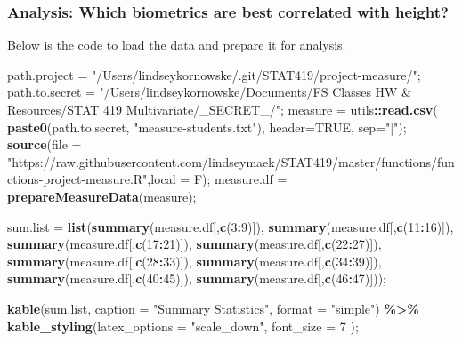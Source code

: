 \documentclass[]{article}
\newenvironment{Shaded}{\begin{snugshade}}{\end{snugshade}}
\newcommand{\DataTypeTok}[1]{\textcolor[rgb]{0.13,0.29,0.53}{#1}}
\newcommand{\DecValTok}[1]{\textcolor[rgb]{0.00,0.00,0.81}{#1}}
\newcommand{\KeywordTok}[1]{\textcolor[rgb]{0.13,0.29,0.53}{\textbf{#1}}}
\newcommand{\NormalTok}[1]{#1}
\newcommand{\OperatorTok}[1]{\textcolor[rgb]{0.81,0.36,0.00}{\textbf{#1}}}
\newcommand{\OtherTok}[1]{\textcolor[rgb]{0.56,0.35,0.01}{#1}}
\newcommand{\StringTok}[1]{\textcolor[rgb]{0.31,0.60,0.02}{#1}}
\begin{document}
\subsubsection{Analysis:  Which biometrics are best correlated with height?}
\label{sec:anrq}

Below is the code to load the data and prepare it for analysis.

\begin{Shaded}
\begin{Highlighting}[]
\NormalTok{path.project =}\StringTok{ "/Users/lindseykornowske/.git/STAT419/project{-}measure/"}\NormalTok{;}
\NormalTok{path.to.secret =}\StringTok{ "/Users/lindseykornowske/Documents/FS Classes HW \& Resources/STAT 419 Multivariate/\_SECRET\_/"}\NormalTok{;}
\NormalTok{measure =}\StringTok{ }\NormalTok{utils}\OperatorTok{::}\KeywordTok{read.csv}\NormalTok{( }\KeywordTok{paste0}\NormalTok{(path.to.secret, }\StringTok{"measure{-}students.txt"}\NormalTok{), }\DataTypeTok{header=}\OtherTok{TRUE}\NormalTok{, }\DataTypeTok{sep=}\StringTok{"|"}\NormalTok{);}
\KeywordTok{source}\NormalTok{(}\DataTypeTok{file =} \StringTok{"https://raw.githubusercontent.com/lindseymaek/STAT419/master/functions/functions{-}project{-}measure.R"}\NormalTok{,}\DataTypeTok{local =}\NormalTok{ F);}
\NormalTok{measure.df =}\StringTok{ }\KeywordTok{prepareMeasureData}\NormalTok{(measure);}

\NormalTok{sum.list =}\StringTok{ }\KeywordTok{list}\NormalTok{(}\KeywordTok{summary}\NormalTok{(measure.df[,}\KeywordTok{c}\NormalTok{(}\DecValTok{3}\OperatorTok{:}\DecValTok{9}\NormalTok{)]),}
\KeywordTok{summary}\NormalTok{(measure.df[,}\KeywordTok{c}\NormalTok{(}\DecValTok{11}\OperatorTok{:}\DecValTok{16}\NormalTok{)]),}
\KeywordTok{summary}\NormalTok{(measure.df[,}\KeywordTok{c}\NormalTok{(}\DecValTok{17}\OperatorTok{:}\DecValTok{21}\NormalTok{)]),}
\KeywordTok{summary}\NormalTok{(measure.df[,}\KeywordTok{c}\NormalTok{(}\DecValTok{22}\OperatorTok{:}\DecValTok{27}\NormalTok{)]),}
\KeywordTok{summary}\NormalTok{(measure.df[,}\KeywordTok{c}\NormalTok{(}\DecValTok{28}\OperatorTok{:}\DecValTok{33}\NormalTok{)]),}
\KeywordTok{summary}\NormalTok{(measure.df[,}\KeywordTok{c}\NormalTok{(}\DecValTok{34}\OperatorTok{:}\DecValTok{39}\NormalTok{)]),}
\KeywordTok{summary}\NormalTok{(measure.df[,}\KeywordTok{c}\NormalTok{(}\DecValTok{40}\OperatorTok{:}\DecValTok{45}\NormalTok{)]),}
\KeywordTok{summary}\NormalTok{(measure.df[,}\KeywordTok{c}\NormalTok{(}\DecValTok{46}\OperatorTok{:}\DecValTok{47}\NormalTok{)]));}

\KeywordTok{kable}\NormalTok{(sum.list, }\DataTypeTok{caption =} \StringTok{"Summary Statistics"}\NormalTok{, }\DataTypeTok{format =} \StringTok{"simple"}\NormalTok{) }\OperatorTok{\%\textgreater{}\%}\StringTok{ }\KeywordTok{kable\_styling}\NormalTok{(}\DataTypeTok{latex\_options =} \StringTok{"scale\_down"}\NormalTok{, }\DataTypeTok{font\_size =} \DecValTok{7}\NormalTok{ );}
\end{Highlighting}
\end{Shaded}
\end{document}
